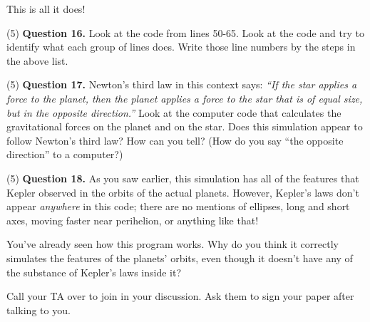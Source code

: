\documentclass[11pt]{article}
\begin{document}
This is all it does! 

\vspace{1em}

(5) \textbf{Question 16.} Look at the code from lines 50-65. Look at the code and try to identify what each group of lines does. Write those line numbers by the steps in the above list. 

(5) \textbf{Question 17.} Newton's third law in this context says: {\it ``If the star applies a force to the planet, then the planet applies a force to the star that is of equal size, but in the opposite direction.''} Look at the
computer code that calculates the gravitational forces on the planet and on the star. Does this simulation appear to follow Newton's third law? How can you tell? (How do you say ``the opposite direction'' to a computer?)

\vspace{1.5in}


(5) \textbf{Question 18.} As you saw earlier, this simulation has all of the features that Kepler observed in the orbits of the actual planets. However, Kepler's laws don't appear {\it anywhere} in this code; there are no mentions of ellipses, long and short axes, moving faster near perihelion, or anything like that!

You've already seen how this program works. Why do you think it correctly simulates the features of the planets' orbits, even though it doesn't have any of the substance of Kepler's laws inside it?

Call your TA over to join in your discussion. Ask them to sign your paper after talking to you.
\end{document}
